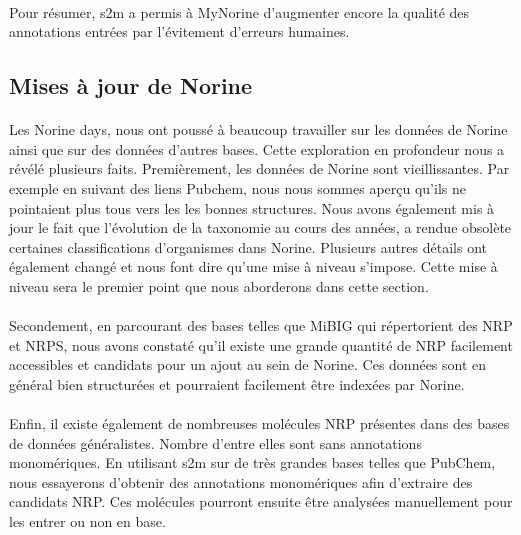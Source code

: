 \documentclass[12pt,french,twoside]{report}
\begin{document}
\paragraph{}Pour résumer, s2m a permis à MyNorine d'augmenter encore la qualité des annotations entrées par l'évitement d'erreurs humaines.




\subsection{Mises à jour de Norine}

\paragraph{}Les Norine days, nous ont poussé à beaucoup travailler sur les données de Norine ainsi que sur des données d'autres bases.
Cette exploration en profondeur nous a révélé plusieurs faits.
Premièrement, les données de Norine sont vieillissantes.
Par exemple en suivant des liens Pubchem, nous nous sommes aperçu qu'ils ne pointaient plus tous vers les les bonnes structures.
Nous avons également mis à jour le fait que l'évolution de la taxonomie au cours des années, a rendue obsolète certaines classifications d'organismes dans Norine.
Plusieurs autres détails ont également changé et nous font dire qu'une mise à niveau s'impose.
Cette mise à niveau sera le premier point que nous aborderons dans cette section.

\paragraph{}Secondement, en parcourant des bases telles que MiBIG qui répertorient des NRP et NRPS, nous avons constaté qu'il existe une grande quantité de NRP facilement accessibles et candidats pour un ajout au sein de Norine.
Ces données sont en général bien structurées et pourraient facilement être indexées par Norine.

\paragraph{}Enfin, il existe également de nombreuses molécules NRP présentes dans des bases de données généralistes.
Nombre d'entre elles sont sans annotations monomériques.
En utilisant s2m sur de très grandes bases telles que PubChem, nous essayerons d'obtenir des annotations monomériques afin d'extraire des candidats NRP.
Ces molécules pourront ensuite être analysées manuellement pour les entrer ou non en base.
\end{document}
